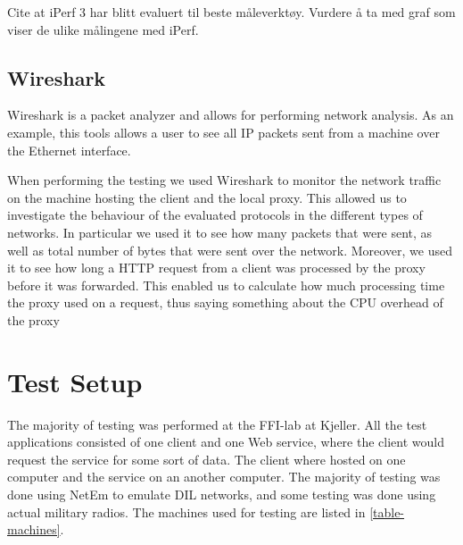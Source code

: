 Cite at iPerf 3 har blitt evaluert til beste måleverktøy. Vurdere å ta med graf som viser de ulike målingene med iPerf.

\subsection{Wireshark}

Wireshark is a packet analyzer and allows for performing network
analysis\cite{wireshark-homepage}. As an example, this tools allows a user to
see all IP packets sent from a machine over the Ethernet interface.

When performing the testing we used Wireshark to monitor the network traffic on
the machine hosting the client and the local proxy. This allowed us to
investigate the behaviour of the evaluated protocols in the different types of
networks. In particular we used it to see how many packets that were sent, as
well as total number of bytes that were sent over the network. Moreover, we used
it to see how long a HTTP request from a client was processed by the proxy
before it was forwarded. This enabled us to calculate how much processing time the
proxy used on a request, thus saying something about the CPU overhead of the proxy

\section{Test Setup}
\label{testing-environment}

The majority of testing was performed at the FFI-lab at Kjeller. All the test
applications consisted of one client and one Web service, where the client would
request the service for some sort of data. The client where hosted on one
computer and the service on an another computer. The majority of testing was
done using NetEm to emulate DIL networks, and some testing was done using actual
military radios. The machines used for testing are listed in
\cref{table-machines}.

